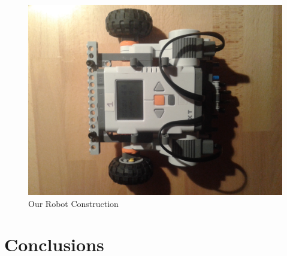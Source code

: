 \documentclass[a4paper,12pt,oneside]{article}
\begin{document}
\begin{enumerate}
\begin{figure}
	\centering
	\includegraphics[width=7 cm]{robot.jpg}
	\caption{Our Robot Construction}
\end{figure}


\section{Conclusions}


\end{enumerate}
\end{document}
